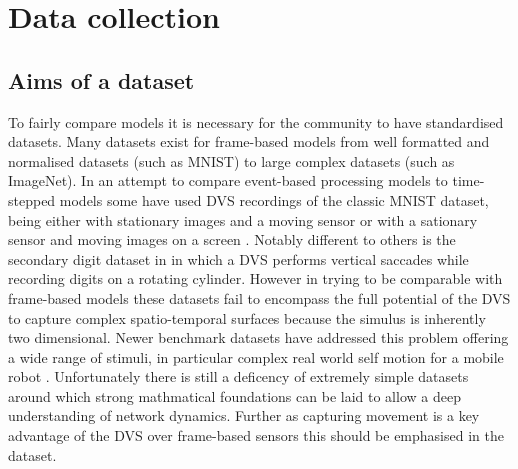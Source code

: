 \chapter{Data collection}

\section{Aims of a dataset}
To fairly compare models it is necessary for the community to have standardised datasets\cite{barranco2016dataset, Gibson2014, tan2015benchmarking}.
Many datasets exist for frame-based models from well formatted and normalised datasets (such as MNIST\cite{lecun1998gradient}) to large complex datasets (such as ImageNet\cite{deng2009imagenet}).
In an attempt to compare event-based processing models to time-stepped models some have used DVS recordings of the classic MNIST dataset, being either with stationary images and a moving sensor \cite{OConnor2013, orchard2015converting} or with a sationary sensor and moving images on a screen \cite{serrano2015poker, akolkar2015can}.
Notably different to others is the secondary digit dataset in \cite{akolkar2015can} in which a DVS performs vertical saccades while recording digits on a rotating cylinder.
However in trying to be comparable with frame-based models these datasets fail to encompass the full potential of the DVS to capture complex spatio-temporal surfaces because the simulus is inherently two dimensional.
Newer benchmark datasets have addressed this problem offering a wide range of stimuli, in particular complex real world self motion for a mobile robot \cite{Gibson2014, barranco2016dataset}. 
Unfortunately there is still a deficency of extremely simple datasets around which strong mathmatical foundations can be laid to allow a deep understanding of network dynamics.
Further as capturing movement is a key advantage of the DVS over frame-based sensors this should be emphasised in the dataset. 

